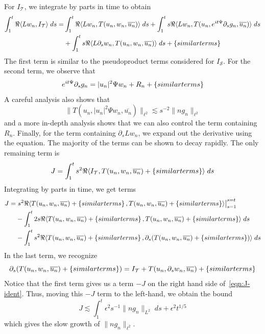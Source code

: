 \documentclass[letterpaper, reqno,final]{amsart}
\newcommand{\cS}{\mathcal{S}}
\newcommand{\cT}{\mathcal{T}}
\newcommand{\btext}[1]{\left\{\textup{#1}\right\}}
\newcommand{\bsim}{\btext{similar terms}}
\begin{document}
For $I_\cT$, we integrate by parts in time to obtain
\begin{equation*}\begin{split}
    \int_1^t \Re\langle Lw_n, I_\cT\rangle\;ds =& \int_1^t \Re\langle Lw_n, T(u_n, w_n, \overline{u_n})\rangle \;ds + \int_1^t s\Re\langle Lw_n, T(u_n, e^{it\Psi} \partial_s g_n, \overline{u_n})\rangle\;ds\\
    &+ \int_1^t s\Re\langle L\partial_s w_n, T(u_n, w_n, \overline{u_n})\rangle\;ds + \bsim
\end{split}\end{equation*}
The first term is similar to the pseudoproduct terms considered for $I_\cS$.  For the second term, we observe that
\begin{equation*}
    e^{it\Psi} \partial_s g_n = |u_n|^2 \Psi w_n + R_n + \bsim
\end{equation*}
A careful analysis also shows that
\begin{equation*}
    \lVert T(u_n, |u_n|^2 \Psi w_n, \overline{u_n}) \rVert_{\ell^2} \lesssim s^{-2} \lVert ng_n \rVert_{\ell^2}
\end{equation*}
and a more in-depth analysis shows that we can also control the term containing $R_n$.  Finally, for the term containing $\partial_s Lw_n$, we expand out the derivative using the equation.  The majority of the terms can be shown to decay rapidly.  The only remaining term is
\begin{equation*}
    J = \int_1^t s^2 \Re \langle I_\cT, T(u_n, w_n, \overline{u_n}) + \bsim\rangle\;ds
\end{equation*}
Integrating by parts in time, we get terms
\begin{equation}\begin{split}
    J =& \left.s^2 \Re\langle T(u_n, w_n, \overline{u_n}) + \bsim, T(u_n, w_n, \overline{u_n}) + \bsim \rangle \right|_{s=1}^{s=t}\\
    &- \int_1^t 2s \Re\langle T(u_n, w_n, \overline{u_n}) + \bsim, T(u_n, w_n, \overline{u_n}) + \bsim \rangle\;ds\\
    &- \int_1^t s^2 \Re\langle T(u_n, w_n, \overline{u_n}) + \bsim, \partial_s (T(u_n, w_n, \overline{u_n}) + \bsim )\rangle\;ds
\end{split}\label{eqn:J-ident}\end{equation}
In the last term, we recognize
\begin{equation*}
    \partial_s (T(u_n, w_n, \overline{u_n}) + \bsim ) = I_\cT + T(u_n, \partial_s w_n, \overline{u_n}) + \bsim
\end{equation*}
Notice that the first term gives us a term $-J$ on the right hand side of~\eqref{eqn:J-ident}.  Thus, moving this $-J$ term to the left-hand, we obtain the bound
\begin{equation*}
    J \lesssim \int_1^t \epsilon^2 s^{-1} \lVert ng_n \rVert_{L^2} \;ds + \epsilon^2 t^{1/5}
\end{equation*}
which gives the slow growth of $\lVert n g_n \rVert_{\ell^2}$.
\end{document}
